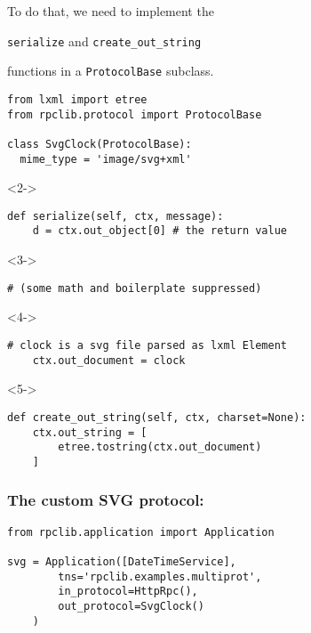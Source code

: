 \documentclass{beamer}
\begin{document}
\begin{frame}
  \LARGE
  \begin{center}
    To do that, we need to implement the

    \bigskip

    \texttt{serialize} and \texttt{create\_out\_string}

    \bigskip

    functions in a \texttt{ProtocolBase} subclass.
  \end{center}
\end{frame}

\begin{frame}[fragile]
  \small
  \begin{lstlisting}[frame=none]
from lxml import etree
from rpclib.protocol import ProtocolBase

class SvgClock(ProtocolBase):
  mime_type = 'image/svg+xml'
  \end{lstlisting}

\begin{uncoverenv}<2->
  \begin{lstlisting}[frame=none]
  def serialize(self, ctx, message):
    d = ctx.out_object[0] # the return value
  \end{lstlisting}
\end{uncoverenv}
\begin{uncoverenv}<3->
  \begin{lstlisting}[frame=none]
    # (some math and boilerplate suppressed)
  \end{lstlisting}
\end{uncoverenv}
\begin{uncoverenv}<4->
  \begin{lstlisting}[frame=none]
    # clock is a svg file parsed as lxml Element
    ctx.out_document = clock
  \end{lstlisting}
\end{uncoverenv}

\begin{uncoverenv}<5->
  \begin{lstlisting}[frame=none]
  def create_out_string(self, ctx, charset=None):
    ctx.out_string = [
        etree.tostring(ctx.out_document)
    ]
  \end{lstlisting}
\end{uncoverenv}
\end{frame}

\begin{frame}[fragile]
\frametitle{The custom SVG protocol:}
\begin{lstlisting}[emph={SvgClock}]
from rpclib.application import Application

svg = Application([DateTimeService],
        tns='rpclib.examples.multiprot',
        in_protocol=HttpRpc(),
        out_protocol=SvgClock()
    )

\end{lstlisting}

\end{frame}
\end{document}

